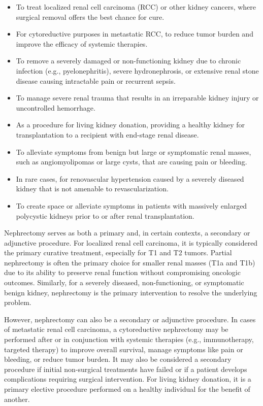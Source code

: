 \begin{itemize}
  \item To treat localized renal cell carcinoma (RCC) or other kidney cancers, where surgical removal offers the best chance for cure.
  \item For cytoreductive purposes in metastatic RCC, to reduce tumor burden and improve the efficacy of systemic therapies.
  \item To remove a severely damaged or non-functioning kidney due to chronic infection (e.g., pyelonephritis), severe hydronephrosis, or extensive renal stone disease causing intractable pain or recurrent sepsis.
  \item To manage severe renal trauma that results in an irreparable kidney injury or uncontrolled hemorrhage.
  \item As a procedure for living kidney donation, providing a healthy kidney for transplantation to a recipient with end-stage renal disease.
  \item To alleviate symptoms from benign but large or symptomatic renal masses, such as angiomyolipomas or large cysts, that are causing pain or bleeding.
  \item In rare cases, for renovascular hypertension caused by a severely diseased kidney that is not amenable to revascularization.
  \item To create space or alleviate symptoms in patients with massively enlarged polycystic kidneys prior to or after renal transplantation.
\end{itemize}

Nephrectomy serves as both a primary and, in certain contexts, a secondary or adjunctive procedure. For localized renal cell carcinoma, it is typically considered the primary curative treatment, especially for T1 and T2 tumors. Partial nephrectomy is often the primary choice for smaller renal masses (T1a and T1b) due to its ability to preserve renal function without compromising oncologic outcomes. Similarly, for a severely diseased, non-functioning, or symptomatic benign kidney, nephrectomy is the primary intervention to resolve the underlying problem.

However, nephrectomy can also be a secondary or adjunctive procedure. In cases of metastatic renal cell carcinoma, a cytoreductive nephrectomy may be performed after or in conjunction with systemic therapies (e.g., immunotherapy, targeted therapy) to improve overall survival, manage symptoms like pain or bleeding, or reduce tumor burden. It may also be considered a secondary procedure if initial non-surgical treatments have failed or if a patient develops complications requiring surgical intervention. For living kidney donation, it is a primary elective procedure performed on a healthy individual for the benefit of another.

